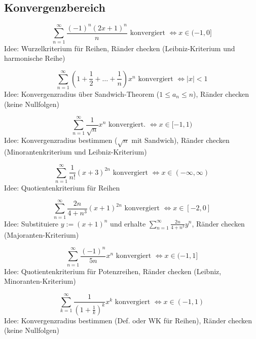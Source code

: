 \documentclass[parskip=full]{scrartcl}
\begin{document}
\subsection{Konvergenzbereich}
\begin{displaymath}
  \sum_{n = 1}^{\infty} \frac{(-1)^n(2x+1)^n}{n} \text{ konvergiert } \iff x \in (-1, 0]
\end{displaymath}
Idee: Wurzelkriterium für Reihen, Ränder checken (Leibniz-Kriterium und harmonische Reihe)

\begin{displaymath}
  \sum_{n = 1}^{\infty} \left(1+\frac{1}{2}+\dots+\frac{1}{n}\right)x^n \text{ konvergiert } \iff |x| < 1
\end{displaymath}
Idee: Konvergenzradius über Sandwich-Theorem ($1 \leq a_n \leq n$), Ränder checken (keine Nullfolgen)

\begin{displaymath}
  \sum_{n = 1}^{\infty} \frac{1}{\sqrt{n}} x^n \text{ konvergiert. } \iff x \in [-1, 1)
\end{displaymath}
Idee: Konvergenzradius bestimmen ($\sqrt{n}$ mit Sandwich), Ränder checken (Minorantenkriterium und Leibniz-Kriterium)

\begin{displaymath}
  \sum_{n = 1}^{\infty} \frac{1}{n!} (x+3)^{2n} \text{ konvergiert } \iff x \in (-\infty, \infty)
\end{displaymath}
Idee: Quotientenkriterium für Reihen

\begin{displaymath}
  \sum_{n = 1}^{\infty} \frac{2n}{4+n^3}(x+1)^{2n} \text{ konvergiert } \iff x \in [-2, 0]
\end{displaymath}
Idee: Substituiere $y := (x+1)^n$ und erhalte $\sum_{n = 1}^{\infty} \frac{2n}{4 + n^3}y^n$, Ränder checken (Majoranten-Kriterium)

\begin{displaymath}
  \sum_{n = 1}^{\infty} \frac{(-1)^n}{5n} x^n \text{ konvergiert } \iff x \in (-1, 1]
\end{displaymath}
Idee: Quotientenkriterium für Potenzreihen, Ränder checken (Leibniz, Minoranten-Kriterium)

\begin{displaymath}
  \sum_{k = 1}^{\infty} \frac{1}{\left(1 + \frac{1}{k}\right)^k} x^k \text{ konvergiert } \iff x \in (-1,1)
\end{displaymath}
Idee: Konvergenzradius bestimmen (Def. oder WK für Reihen), Ränder checken (keine Nullfolgen)
\end{document}
